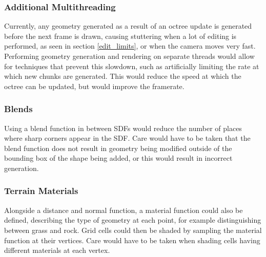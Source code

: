 \documentclass[11pt]{article}
\begin{document}
\subsubsection{Additional Multithreading}
Currently, any geometry generated as a result of an octree update is generated before the next frame is drawn, causing stuttering when a lot of editing is performed, as seen in section \ref{edit_limits}, or when the camera moves very fast. Performing geometry generation and rendering on separate threads would allow for techniques that prevent this slowdown, such as artificially limiting the rate at which new chunks are generated. This would reduce the speed at which the octree can be updated, but would improve the framerate.
\subsubsection{Blends}
Using a blend function in between SDFs would reduce the number of places where sharp corners appear in the SDF. Care would have to be taken that the blend function does not result in geometry being modified outside of the bounding box of the shape being added, or this would result in incorrect generation.
\subsubsection{Terrain Materials}
Alongside a distance and normal function, a material function could also be defined, describing the type of geometry at each point, for example distinguishing between grass and rock. Grid cells could then be shaded by sampling the material function at their vertices. Care would have to be taken when shading cells having different materials at each vertex.


\end{document}
